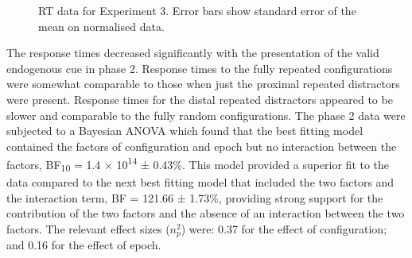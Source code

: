 \documentclass[
  man,
  floatsintext,
  longtable,
  nolmodern,
  notxfonts,
  notimes,
  colorlinks=true,linkcolor=blue,citecolor=blue,urlcolor=blue]{apa7}
\begin{document}
\begin{figure}[H]


\caption{\label{fig-RT-exp3}RT data for Experiment 3. Error bars show
standard error of the mean on normalised data.}

\end{figure}%

The response times decreased significantly with the presentation of the
valid endogenous cue in phase 2. Response times to the fully repeated
configurations were somewhat comparable to those when just the proximal
repeated distractors were present. Response times for the distal
repeated distractors appeared to be slower and comparable to the fully
random configurations. The phase 2 data were subjected to a Bayesian
ANOVA which found that the best fitting model contained the factors of
configuration and epoch but no interaction between the factors,
BF\textsubscript{10} = 1.4 × 10\textsuperscript{14} ± 0.43\%. This model
provided a superior fit to the data compared to the next best fitting
model that included the two factors and the interaction term, BF =
121.66 ± 1.73\%, providing strong support for the contribution of the
two factors and the absence of an interaction between the two factors.
The relevant effect sizes (\(n^2_p\)) were: 0.37 for the effect of
configuration; and 0.16 for the effect of epoch.
\end{document}
